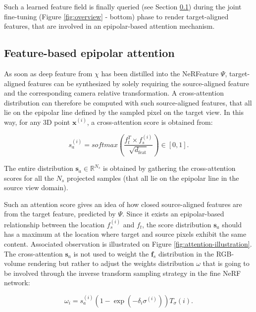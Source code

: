  Such a learned feature field is finally queried (see Section \ref{subsec:epipolar_att}) during the joint fine-tuning (Figure \ref{fig:overview} - bottom) phase to render target-aligned features, that are involved in an epipolar-based attention mechanism. 
 
\subsection{Feature-based epipolar attention}
\label{subsec:epipolar_att}

As soon as deep feature from $\chi$ has been distilled into the NeRFeature $\Psi$, target-aligned features can be synthesized by solely requiring the source-aligned feature and the corresponding camera relative transformation. A cross-attention distribution \cite{vaswani2017attention} can therefore be computed with such source-aligned features, that all lie on the epipolar line defined by the sampled pixel on the target view. In this way, for any 3D point $\mathbf{x}^{(i)}$, a cross-attention score is obtained from: 

\begin{equation}
    s_{a}^{(i)} = softmax\left(\frac{f_{t}^{T}\times f_{s}^{(i)}}{\sqrt{d_{\text{feat}}}}\right) \in [0,1].
\label{eq:attention}
\end{equation}

The entire distribution $\textbf{s}_{a} \in \mathbb{R}^{N_{s}}$ is obtained by gathering the cross-attention scores for all the $N_s$ projected samples (that all lie on the epipolar line in the source view domain). 

Such an attention score gives an idea of how closed source-aligned features are from the target feature, predicted by $\Psi$. Since it exists an epipolar-based relationship between the location $f_{s}^{(i)}$ and $f_{t}$, the score distribution $\mathbf{s}_{a}$ should has a maximum at the location where target and source pixels exhibit the same content. Associated observation is illustrated on Figure \ref{fig:attention-illustration}. The cross-attention $\mathbf{s}_{a}$ is not used to weight the $\mathbf{f}_{s}$ distribution in the RGB-volume rendering \cite{Max1995OpticalMF} but rather to adjust the weights distribution $\omega$ that is going to be involved through the inverse transform sampling strategy \cite{mildenhall2020nerf} in the fine NeRF network: 

\begin{equation}
    \omega_{i} = s_{a}^{(i)} \left(1 - \exp(-\delta_{i}\sigma^{(i)})\right)T_{\sigma}(i).
\end{equation}


